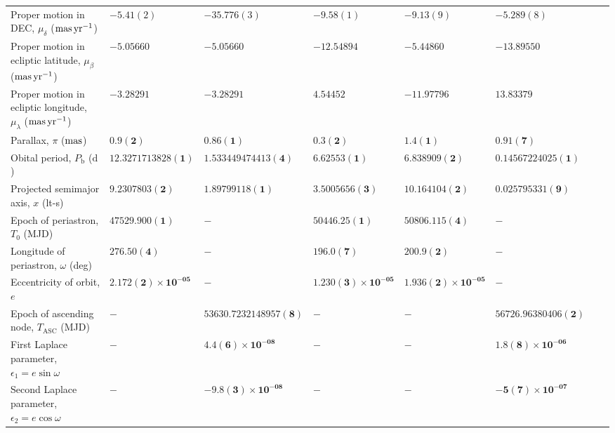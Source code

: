 \begin{table}
\begin{tabular}{llllllll}
Proper motion in DEC, $\mu_\delta$ (${\rm mas}\,{\rm yr}^{-1}$)	 & 	 $-5.41(2)$	 & 	 $-35.776(3)$	 & 	 $-9.58(1)$	 & 	 $-9.13(9)$	 & 	 $-5.289(8)$\\ 
Proper motion in ecliptic latitude, $\mu_\beta$ (${\rm mas}\,{\rm yr}^{-1}$)	 & 	 $\mathbf{ -5.05660 }$	 & 	 $\mathbf{ -5.05660 }$	 & 	 $\mathbf{ -12.54894 }$	 & 	 $\mathbf{ -5.44860 }$	 & 	 $\mathbf{ -13.89550 }$\\ 
Proper motion in ecliptic longitude, $\mu_\lambda$ (${\rm mas}\,{\rm yr}^{-1}$)	 & 	 $\mathbf{ -3.28291 }$	 & 	 $\mathbf{ -3.28291 }$	 & 	 $\mathbf{ 4.54452 }$	 & 	 $\mathbf{ -11.97796 }$	 & 	 $\mathbf{ 13.83379 }$\\ 
Parallax, $\pi$ (${\rm mas}$)	 & 	 $\mathbf{ 0.9(2) }$	 & 	 $\mathbf{ 0.86(1) }$	 & 	 $\mathbf{ 0.3(2) }$	 & 	 $\mathbf{ 1.4(1) }$	 & 	 $\mathbf{ 0.91(7) }$\\ 
Obital period, $P_{\mathrm{b}}$ ($\mathrm{d}$)	 & 	 $\mathbf{ 12.3271713828(1) }$	 & 	 $\mathbf{ 1.533449474413(4) }$	 & 	 $\mathbf{ 6.62553(1) }$	 & 	 $\mathbf{ 6.838909(2) }$	 & 	 $\mathbf{ 0.14567224025(1) }$\\ 
Projected semimajor axis, $x$ (lt-s)	 & 	 $\mathbf{ 9.2307803(2) }$	 & 	 $\mathbf{ 1.89799118(1) }$	 & 	 $\mathbf{ 3.5005656(3) }$	 & 	 $\mathbf{ 10.164104(2) }$	 & 	 $\mathbf{ 0.025795331(9) }$\\ 
Epoch of periastron, $T_0$ (MJD)	 & 	 $\mathbf{ 47529.900(1) }$	 & 	 $\mathbf{ - }$	 & 	 $\mathbf{ 50446.25(1) }$	 & 	 $\mathbf{ 50806.115(4) }$	 & 	 $\mathbf{ - }$\\ 
Longitude of periastron, $\omega$ (deg)	 & 	 $\mathbf{ 276.50(4) }$	 & 	 $\mathbf{ - }$	 & 	 $\mathbf{ 196.0(7) }$	 & 	 $\mathbf{ 200.9(2) }$	 & 	 $\mathbf{ - }$\\ 
Eccentricity of orbit, $e$	 & 	 $\mathbf{ 2.172(2)\times 10^{-05} }$	 & 	 $\mathbf{ - }$	 & 	 $\mathbf{ 1.230(3)\times 10^{-05} }$	 & 	 $\mathbf{ 1.936(2)\times 10^{-05} }$	 & 	 $\mathbf{ - }$\\ 
Epoch of ascending node, $T_{\mathrm{ASC}}$ (MJD)	 & 	 $\mathbf{ - }$	 & 	 $\mathbf{ 53630.7232148957(8) }$	 & 	 $\mathbf{ - }$	 & 	 $\mathbf{ - }$	 & 	 $\mathbf{ 56726.96380406(2) }$\\ 
First Laplace parameter, $\epsilon_1 = e \sin \omega$	 & 	 $\mathbf{ - }$	 & 	 $\mathbf{ 4.4(6)\times 10^{-08} }$	 & 	 $\mathbf{ - }$	 & 	 $\mathbf{ - }$	 & 	 $\mathbf{ 1.8(8)\times 10^{-06} }$\\ 
Second Laplace parameter, $\epsilon_2 = e \cos \omega$	 & 	 $\mathbf{ - }$	 & 	 $\mathbf{ -9.8(3)\times 10^{-08} }$	 & 	 $\mathbf{ - }$	 & 	 $\mathbf{ - }$	 & 	 $\mathbf{ -5(7)\times 10^{-07} }$\\ 

\end{tabular}
\end{table}
